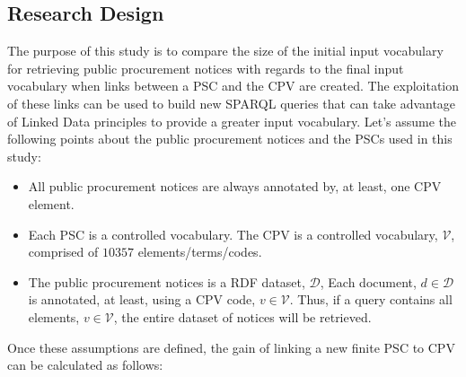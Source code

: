 \subsection{Research Design}
The purpose of this study is to compare the size of the initial input vocabulary for retrieving public procurement notices 
with regards to the final input vocabulary when links between a PSC and the CPV are created. The exploitation of these links can be used 
to build new SPARQL queries that can take advantage of Linked Data principles to provide a greater input vocabulary. Let's assume the following points about the 
public procurement notices and the PSCs used in this study:
\begin{itemize}
 \item All public procurement notices are always annotated by, at least, one CPV element.
 \item Each PSC is a controlled vocabulary. The CPV is a controlled vocabulary, $\mathcal{V}$, comprised of $10357$ elements/terms/codes.
 \item The public procurement notices is a RDF dataset, $\mathcal{D}$,
 Each document, $d \in \mathcal{D}$ is annotated, at least, using a CPV code, $v \in \mathcal{V}$. Thus, 
 if a query contains all elements, $v \in \mathcal{V}$, the entire dataset of notices will be retrieved.
\end{itemize}
Once these assumptions are defined, the gain of linking a new finite PSC to CPV can be calculated as follows:
